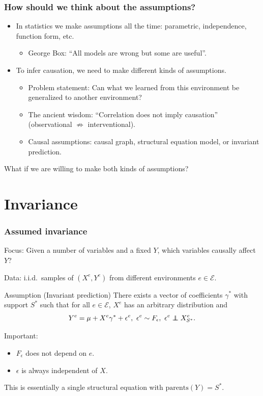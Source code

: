 \documentclass{beamer}
\newcommand\independent{\protect\mathpalette{\protect\independenT}{\perp}}
\def\independenT#1#2{\mathrel{\rlap{$#1#2$}\mkern2mu{#1#2}}}
\begin{document}
\begin{frame}
  \frametitle{How should we think about the assumptions?}
  \begin{itemize}
  \item In statistics we make assumptions all the
    time: parametric, independence, function form, etc.
    \begin{itemize}
    \item George Box: ``All models are wrong but some are useful''.
    \end{itemize}
  \item To infer causation, we need to make different kinds of
    assumptions.
    \begin{itemize}
    \item Problem statement: Can what we learned from this environment
      be generalized to another environment?
    \item The ancient wisdom: ``Correlation does not imply
      causation'' (observational $\not \Rightarrow$ interventional).
    \item Causal assumptions: causal graph, structural equation model,
      or invariant prediction.
    \end{itemize}
  \end{itemize}

  \begin{center}
    What if we are willing to make both kinds of assumptions?
  \end{center}
\end{frame}

\section{Invariance}

\begin{frame}
  \sectionpage
\end{frame}

\begin{frame}
  \frametitle{Assumed invariance}
  Focus: Given a number of variables and a fixed $Y$, which variables
  causally affect $Y$?

  Data: i.i.d.\ samples of $(X^e,Y^e)$ from different environments $e
  \in \mathcal{E}$.

  \begin{block}{Assumption (Invariant prediction)}
    There exists a vector of coefficients $\gamma^{*}$ with support
    $S^{*}$ such that for all $e \in \mathcal{E}$, $X^e$ has an arbitrary
    distribution and
    \[
    Y^e = \mu + X^e \gamma^{*} + \epsilon^e,~\epsilon^e \sim
    F_{\epsilon},~\epsilon^e \independent X^e_{S^{*}}.
    \]
  \end{block}
  Important:
  \begin{itemize}
  \item $F_{\epsilon}$ does not depend on $e$.
  \item $\epsilon$ is always independent of $X$.
  \end{itemize}

  This is essentially a single structural equation with
  $\mathrm{parents}(Y) = S^{*}$.
\end{frame}
\end{document}

